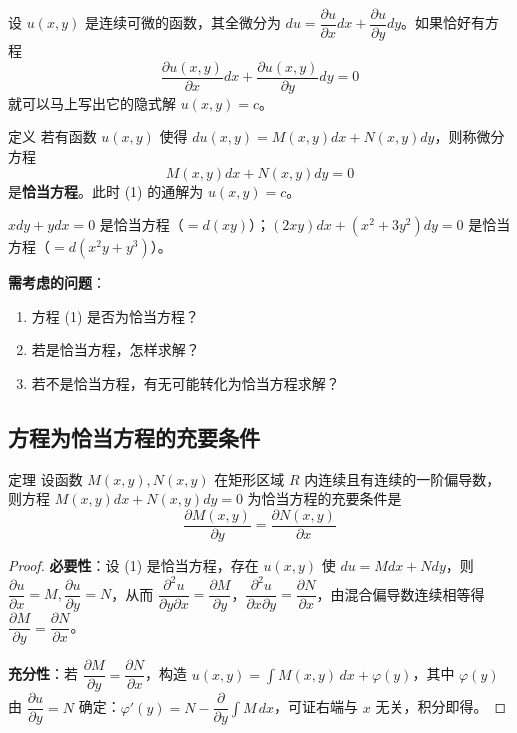 设 $u(x,y)$ 是连续可微的函数，其全微分为 $du = \dfrac{\partial u}{\partial x}dx + \dfrac{\partial u}{\partial y}dy$。如果恰好有方程
$$\frac{\partial u(x,y)}{\partial x}dx + \frac{\partial u(x,y)}{\partial y}dy = 0$$
就可以马上写出它的隐式解 $u(x,y) = c$。

\begin{mydefinition}{定义}
若有函数 $u(x,y)$ 使得 $du(x,y) = M(x,y)dx + N(x,y)dy$，则称微分方程
\begin{equation}M(x,y)dx + N(x,y)dy = 0 \tag{1}\end{equation}
是\textbf{恰当方程}。此时 (1) 的通解为 $u(x,y) = c$。
\end{mydefinition}

\begin{example}
$xdy + ydx = 0$ 是恰当方程（$= d(xy)$）；$(2xy)dx + (x^2 + 3y^2)dy = 0$ 是恰当方程（$= d(x^2y + y^3)$）。
\end{example}

\textbf{需考虑的问题}：
\begin{enumerate}
    \item 方程 (1) 是否为恰当方程？
    \item 若是恰当方程，怎样求解？
    \item 若不是恰当方程，有无可能转化为恰当方程求解？
\end{enumerate}

\subsection{方程为恰当方程的充要条件}

\begin{myTheorem}{定理}
设函数 $M(x,y), N(x,y)$ 在矩形区域 $R$ 内连续且有连续的一阶偏导数，则方程 $M(x,y)dx + N(x,y)dy = 0$ 为恰当方程的充要条件是
\begin{equation}\frac{\partial M(x,y)}{\partial y} = \frac{\partial N(x,y)}{\partial x} \tag{2}\end{equation}
\end{myTheorem}

\begin{proof}
\textbf{必要性}：设 (1) 是恰当方程，存在 $u(x,y)$ 使 $du = Mdx + Ndy$，则 $\dfrac{\partial u}{\partial x} = M, \dfrac{\partial u}{\partial y} = N$，从而 $\dfrac{\partial^2 u}{\partial y\partial x} = \dfrac{\partial M}{\partial y}$，$\dfrac{\partial^2 u}{\partial x\partial y} = \dfrac{\partial N}{\partial x}$，由混合偏导数连续相等得 $\dfrac{\partial M}{\partial y} = \dfrac{\partial N}{\partial x}$。

\textbf{充分性}：若 $\dfrac{\partial M}{\partial y} = \dfrac{\partial N}{\partial x}$，构造 $u(x,y) = \int M(x,y)\,dx + \varphi(y)$，其中 $\varphi(y)$ 由 $\dfrac{\partial u}{\partial y} = N$ 确定：$\varphi'(y) = N - \dfrac{\partial}{\partial y}\int M\,dx$，可证右端与 $x$ 无关，积分即得。
\end{proof}

